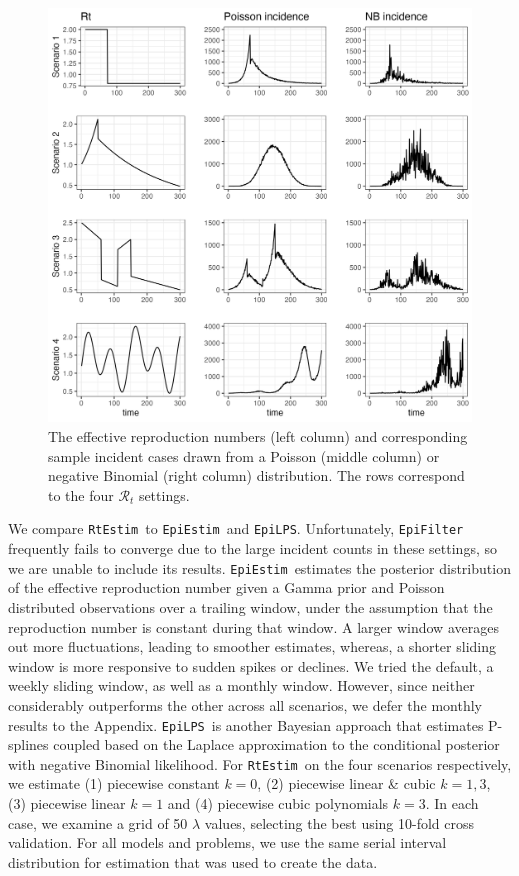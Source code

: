 \documentclass[10pt,letterpaper]{article}
\def\RtEstim{\texttt{RtEstim}}
\def\EpiEstim{\texttt{EpiEstim}}
\def\EpiLPS{\texttt{EpiLPS}}
\def\calR{\mathcal{R}}
\begin{document}
\begin{figure}[!h]
  \centering
  \includegraphics[width=.8\textwidth]{fig/plot_samples.png}
  \caption{The effective reproduction numbers (left column) and corresponding
  sample incident cases drawn from a  Poisson (middle column) or negative
  Binomial (right column) distribution. The rows correspond to the four
  $\calR_t$ settings.} 
  \label{fig:samples}
\end{figure}

We compare \RtEstim\ to \EpiEstim\ and \EpiLPS. Unfortunately,
\texttt{EpiFilter} frequently fails to converge due to the large incident counts
in these settings, so we are unable to include its results. \EpiEstim\ estimates
the posterior distribution of the effective reproduction number given a Gamma
prior and Poisson distributed observations
over a trailing window, under the assumption that the reproduction number is
constant during that window. A larger window averages out more
fluctuations,
leading to smoother estimates, whereas, a shorter sliding window is more
responsive to sudden spikes or declines. We tried the default, a weekly sliding
window, as well as a monthly window. However, since neither considerably
outperforms the other across all scenarios, we defer the monthly results to the
Appendix. \EpiLPS\ is another Bayesian approach that estimates P-splines coupled
based on the Laplace approximation to the conditional posterior with negative
Binomial likelihood. For \RtEstim\ on the four scenarios respectively, we
estimate (1) piecewise constant $k=0$, (2) piecewise linear \& cubic $k=1,3$,
(3) piecewise linear $k=1$ and (4) piecewise cubic polynomials $k=3$. In each
case, we examine a grid of 50 $\lambda$ values, selecting the best using 10-fold
cross validation. For all models and problems, we use the same serial interval
distribution for estimation that was used to create the data. 
\end{document}
